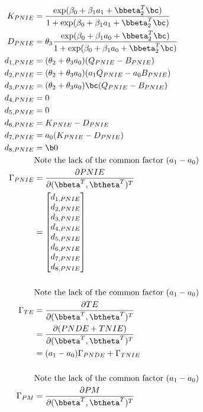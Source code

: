 \documentclass[dvipdfmx,10pt]{article}
\begin{document}
\begin{align*}
  K_{PNIE} &= \frac
      {\exp(\beta_{0} + \beta_{1}a_{1} + \bbeta_{2}^{T}\bc)}
      {1 + \exp(\beta_{0} + \beta_{1}a_{1} + \bbeta_{2}^{T}\bc)}\\
  D_{PNIE} &= \theta_{3} \frac
      {\exp(\beta_{0} + \beta_{1}a_{0} + \bbeta_{2}^{T}\bc)}
      {1 + \exp(\beta_{0} + \beta_{1}a_{0} + \bbeta_{2}^{T}\bc)}\\
  d_{1,PNIE} &= (\theta_{2} + \theta_{3}a_{0}) (Q_{PNIE} - B_{PNIE})\\
  d_{2,PNIE} &= (\theta_{2} + \theta_{3}a_{0}) (a_{1}Q_{PNIE} - a_{0}B_{PNIE})\\
  d_{3,PNIE} &= (\theta_{2} + \theta_{3}a_{0})\bc (Q_{PNIE} - B_{PNIE})\\
  d_{4,PNIE} &= 0\\
  d_{5,PNIE} &= 0\\
  d_{6,PNIE} &= K_{PNIE} - D_{PNIE}\\
  d_{7,PNIE} &= a_{0} (K_{PNIE} - D_{PNIE})\\
  d_{8,PNIE} &= \b0\\
  &\text{Note the lack of the common factor }(a_{1} - a_{0})\\
  \Gamma_{PNIE}
  &= \frac{\partial PNIE}{\partial (\bbeta^{T},\btheta^{T})^{T}}\\
  &= \begin{bmatrix}
      d_{1,PNIE}\\
      d_{2,PNIE}\\
      d_{3,PNIE}\\
      d_{4,PNIE}\\
      d_{5,PNIE}\\
      d_{6,PNIE}\\
      d_{7,PNIE}\\
      d_{8,PNIE}\\
    \end{bmatrix}\\
  \\
  &\text{Note the lack of the common factor }(a_{1} - a_{0})\\
  \Gamma_{TE}
  &= \frac{\partial TE}{\partial (\bbeta^{T},\btheta^{T})^{T}}\\
  &= \frac{\partial (PNDE+TNIE)}{\partial (\bbeta^{T},\btheta^{T})^{T}}\\
  &= (a_{1}-a_{0})\Gamma_{PNDE} + \Gamma_{TNIE}\\
  \\
  &\text{Note the lack of the common factor }(a_{1} - a_{0})\\
  \Gamma_{PM}
  &= \frac{\partial PM}{\partial (\bbeta^{T},\btheta^{T})^{T}}\\

\end{align*}
\end{document}
